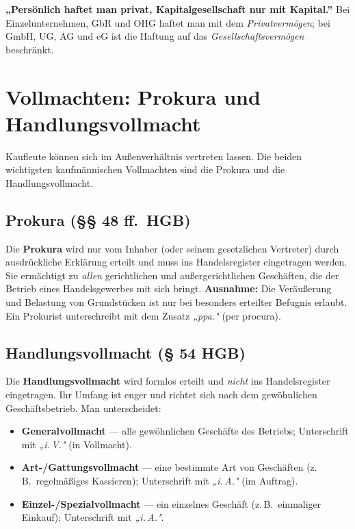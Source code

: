 \documentclass[11pt, a4paper]{article}
\begin{document}
\begin{eselsbruecke}
\textbf{„Persönlich haftet man privat, Kapitalgesellschaft nur mit Kapital.”} Bei
Einzelunternehmen, GbR und OHG haftet man mit dem \emph{Privatvermögen}; bei GmbH, UG, AG
und eG ist die Haftung auf das \emph{Gesellschaftsvermögen} beschränkt.
\end{eselsbruecke}

\section{Vollmachten: Prokura und Handlungsvollmacht}

Kaufleute können sich im Außenverhältnis vertreten lassen. Die beiden wichtigsten
kaufmännischen Vollmachten sind die Prokura und die Handlungsvollmacht.

\subsection{Prokura (§§ 48 ff.\ HGB)}

Die \textbf{Prokura} wird nur vom Inhaber (oder seinem gesetzlichen Vertreter) durch
ausdrückliche Erklärung erteilt und muss ins Handelsregister eingetragen werden. Sie
ermächtigt zu \emph{allen} gerichtlichen und außergerichtlichen Geschäften, die der
Betrieb eines Handelsgewerbes mit sich bringt. \textbf{Ausnahme:} Die Veräußerung und
Belastung von Grundstücken ist nur bei besonders erteilter Befugnis erlaubt. Ein
Prokurist unterschreibt mit dem Zusatz \emph{„ppa."} (per procura).

\subsection{Handlungsvollmacht (§ 54 HGB)}

Die \textbf{Handlungsvollmacht} wird formlos erteilt und \emph{nicht} ins Handelsregister
eingetragen. Ihr Umfang ist enger und richtet sich nach dem gewöhnlichen Geschäftsbetrieb.
Man unterscheidet:

\begin{itemize}
  \item \textbf{Generalvollmacht} --- alle gewöhnlichen Geschäfte des Betriebs; Unterschrift
    mit \emph{„i.\,V."} (in Vollmacht).
  \item \textbf{Art-/Gattungsvollmacht} --- eine bestimmte Art von Geschäften (z.\,B.\
    regelmäßiges Kassieren); Unterschrift mit \emph{„i.\,A."} (im Auftrag).
  \item \textbf{Einzel-/Spezialvollmacht} --- ein einzelnes Geschäft (z.\,B.\ einmaliger
    Einkauf); Unterschrift mit \emph{„i.\,A."}.
\end{itemize}
\end{document}
